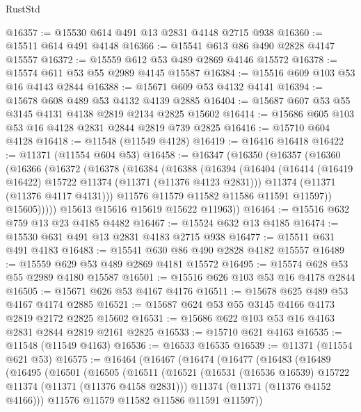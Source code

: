 \begin{lexlean}{RustStd}
\begin{coremodule}
{\begin{coremodule}
{{{{{{{{{{{{{{{{{{{{{{{{{{{{{{{{{@16357 := @15530 @614 @491 @13 @2831 @4148 @2715 @938
@16360 := @15511 @614 @491 @4148
@16366 := @15541 @613 @86 @490 @2828 @4147 @15557
@16372 := @15559 @612 @53 @489 @2869 @4146 @15572
@16378 := @15574 @611 @53 @55 @2989 @4145 @15587
@16384 := @15516 @609 @103 @53 @16 @4143 @2844
@16388 := @15671 @609 @53 @4132 @4141
@16394 := @15678 @608 @489 @53 @4132 @4139 @2885
@16404 := @15687 @607 @53 @55 @3145 @4131 @4138 @2819 @2134 @2825 @15602
@16414 := @15686 @605 @103 @53 @16 @4128 @2831 @2844 @2819 @739 @2825
@16416 := @15710 @604 @4128
@16418 := @11548 (@11549 @4128)
@16419 := @16416 @16418
@16422 := @11371 (@11554 @604 @53)
@16458 := @16347
    (@16350
      (@16357
        (@16360
          (@16366
            (@16372
              (@16378
                (@16384
                  (@16388
                    (@16394
                      (@16404
                        (@16414 (@16419 @16422) @15722 @11374 (@11371 (@11376 @4123 @2831)))
                        @11374
                        (@11371 (@11376 @4117 @4131)))
                      @11576
                      @11579
                      @11582
                      @11586
                      @11591
                      @11597))
                  @15605)))))
        @15613
        @15616
        @15619
        @15622
        @11963))
@16464 := @15516 @632 @759 @13 @23 @4185 @4482
@16467 := @15524 @632 @13 @4185
@16474 := @15530 @631 @491 @13 @2831 @4183 @2715 @938
@16477 := @15511 @631 @491 @4183
@16483 := @15541 @630 @86 @490 @2828 @4182 @15557
@16489 := @15559 @629 @53 @489 @2869 @4181 @15572
@16495 := @15574 @628 @53 @55 @2989 @4180 @15587
@16501 := @15516 @626 @103 @53 @16 @4178 @2844
@16505 := @15671 @626 @53 @4167 @4176
@16511 := @15678 @625 @489 @53 @4167 @4174 @2885
@16521 := @15687 @624 @53 @55 @3145 @4166 @4173 @2819 @2172 @2825 @15602
@16531 := @15686 @622 @103 @53 @16 @4163 @2831 @2844 @2819 @2161 @2825
@16533 := @15710 @621 @4163
@16535 := @11548 (@11549 @4163)
@16536 := @16533 @16535
@16539 := @11371 (@11554 @621 @53)
@16575 := @16464
    (@16467
      (@16474
        (@16477
          (@16483
            (@16489
              (@16495
                (@16501
                  (@16505
                    (@16511
                      (@16521
                        (@16531 (@16536 @16539) @15722 @11374 (@11371 (@11376 @4158 @2831)))
                        @11374
                        (@11371 (@11376 @4152 @4166)))
                      @11576
                      @11579
                      @11582
                      @11586
                      @11591
                      @11597))
}}}}}}}}}}}}}}}}}}}}}}}}}}}}}}}}}
\end{coremodule}}
\end{coremodule}
\end{lexlean}
